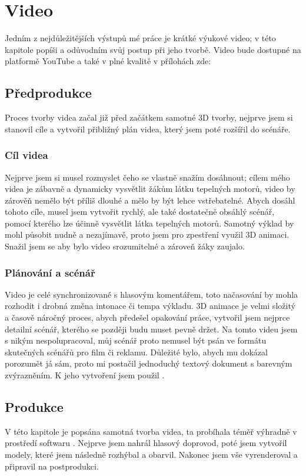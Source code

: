\section{Video}
{Jedním z nejdůležitějších výstupů mé práce je krátké výukové video; v této kapitole popíši a odůvodním svůj postup při jeho tvorbě. Video bude dostupné na platformě YouTube a také v plné kvalitě v přílohách zde:}

\subsection{Předprodukce}
{Proces tvorby videa začal již před začátkem samotné 3D tvorby, nejprve jsem si stanovil cíle a vytvořil přibližný plán videa, který jsem poté rozšířil do scénáře.}\odst

\subsubsection{Cíl videa}
{Nejprve jsem si musel rozmyslet čeho se vlastně snažím dosáhnout; cílem mého videa je zábavně a dynamicky vysvětlit žákům látku tepelných motorů, video by zárověň nemělo být příliš dlouhé a mělo by být lehce vstřebatelné.}\odst
{Abych dosáhl tohoto cíle, musel jsem vytvořit rychlý, ale také dostatečně obsáhlý scénář, pomocí kterého lze účinně vysvětlit látka tepelných motorů. Samotný výklad by mohl působit nudně a nezajímavě, proto jsem pro zpestření využil 3D animaci. Snažil jsem se aby bylo video srozumitelné a zároveň žáky zaujalo.}

\subsubsection{Plánování a scénář}
{Video je celé synchronizované s hlasovým komentářem, toto načasování by mohla rozhodit i drobná změna intonace či tempa výkladu. 3D animace je velmi složitý a časově náročný proces, abych předešel opakování práce, vytvořil jsem nejprce detailní scénář, kterého se později budu muset pevně držet.}\odst
{Na tomto videu jsem s nikým nespolupracoval, můj scénář proto nemusel být psán ve formátu skutečných scénářů pro film či reklamu. Důležité bylo, abych mu dokázal porozumět já sám, proto mi postačil jednoduchý textový dokument s barevným zvýrazněním. K jeho vytvoření jsem použil .}

\newpage

\subsection{Produkce}
{V této kapitole je popsána samotná tvorba videa, ta probíhala téměř výhradně v prostředí softwaru . Nejprve jsem nahrál hlasový doprovod, poté jsem vytvořil modely, které jsem následně rozhýbal a obarvil. Nakonec jsem vše vyrenderoval a připravil na postprodukci.}

